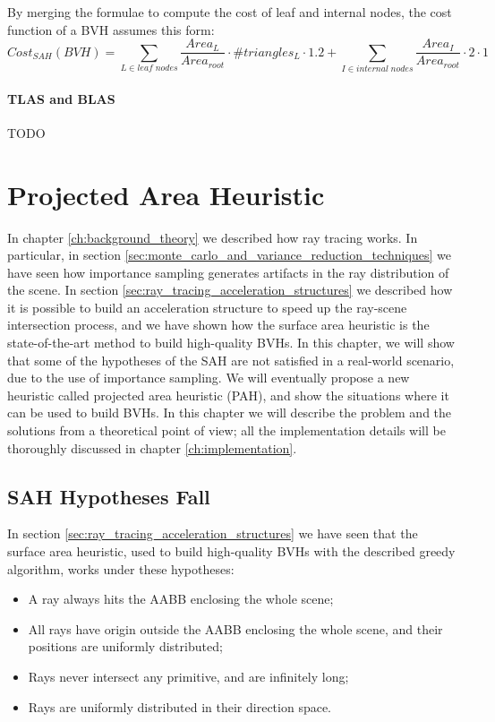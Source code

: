 \documentclass{PoliMi_MasterThesis}
\begin{document}
By merging the formulae to compute the cost of leaf and internal nodes, the cost function of a BVH assumes this form:
$$Cost_{SAH}(BVH) = \sum_{L \in leaf\; nodes} \frac{Area_L}{Area_{root}} \cdot \#triangles_L \cdot 1.2 + \sum_{I \in internal\; nodes} \frac{Area_I}{Area_{root}} \cdot 2 \cdot 1$$

\subsubsection{TLAS and BLAS}
TODO

\chapter{Projected Area Heuristic} \label{ch:projected_area_heuristic}
In chapter \ref{ch:background_theory} we described how ray tracing works. In particular, in section \ref{sec:monte_carlo_and_variance_reduction_techniques} we have seen how importance sampling generates artifacts in the ray distribution of the scene. In section \ref{sec:ray_tracing_acceleration_structures} we described how it is possible to build an acceleration structure to speed up the ray-scene intersection process, and we have shown how the surface area heuristic is the state-of-the-art method to build high-quality BVHs. In this chapter, we will show that some of the hypotheses of the SAH are not satisfied in a real-world scenario, due to the use of importance sampling. We will eventually propose a new heuristic called projected area heuristic (PAH), and show the situations where it can be used to build BVHs. In this chapter we will describe the problem and the solutions from a theoretical point of view; all the implementation details will be thoroughly discussed in chapter \ref{ch:implementation}.

\section{SAH Hypotheses Fall} \label{sec:sah_hypotheses_fall}
In section \ref{sec:ray_tracing_acceleration_structures} we have seen that the surface area heuristic, used to build high-quality BVHs with the described greedy algorithm, works under these hypotheses:
\begin{itemize}
	\item A ray always hits the AABB enclosing the whole scene;
	\item All rays have origin outside the AABB enclosing the whole scene, and their positions are uniformly distributed;
	\item Rays never intersect any primitive, and are infinitely long;
	\item Rays are uniformly distributed in their direction space.
\end{itemize}
\end{document}
